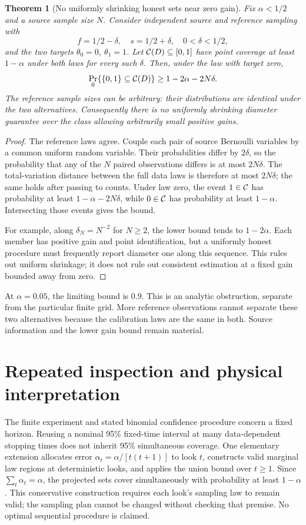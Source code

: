 \documentclass[11pt,a4paper]{article}
\newtheorem{theorem}{Theorem}\newtheorem{proposition}[theorem]{Proposition}\newtheorem{lemma}[theorem]{Lemma}
\theoremstyle{definition}\newtheorem{definition}[theorem]{Definition}
\begin{document}
\begin{theorem}[No uniformly shrinking honest sets near zero gain]\label{thm:weak}
Fix $\alpha<1/2$ and a source sample size $N$. Consider independent source and reference sampling with
\[
f=1/2-\delta,\quad s=1/2+\delta,\quad 0<\delta<1/2,
\]
and the two targets $\theta_0=0$, $\theta_1=1$. Let $\mathcal C(D)\subseteq[0,1]$ have point coverage at least $1-\alpha$ under both laws for every such $\delta$. Then, under the law with target zero,
\[
\Pr_0\{\{0,1\}\subseteq\mathcal C(D)\}\ge1-2\alpha-2N\delta.
\]
The reference sample sizes can be arbitrary: their distributions are identical under the two alternatives. Consequently there is no uniformly shrinking diameter guarantee over the class allowing arbitrarily small positive gains.
\end{theorem}
\begin{proof}
The reference laws agree. Couple each pair of source Bernoulli variables by a common uniform random variable. Their probabilities differ by $2\delta$, so the probability that any of the $N$ paired observations differs is at most $2N\delta$. The total-variation distance between the full data laws is therefore at most $2N\delta$; the same holds after passing to counts. Under law zero, the event $1\in\mathcal C$ has probability at least $1-\alpha-2N\delta$, while $0\in\mathcal C$ has probability at least $1-\alpha$. Intersecting those events gives the bound.

For example, along $\delta_N=N^{-2}$ for $N\ge2$, the lower bound tends to $1-2\alpha$. Each member has positive gain and point identification, but a uniformly honest procedure must frequently report diameter one along this sequence. This rules out uniform shrinkage; it does not rule out consistent estimation at a fixed gain bounded away from zero.
\end{proof}

At $\alpha=0.05$, the limiting bound is $0.9$. This is an analytic obstruction, separate from the particular finite grid. More reference observations cannot separate these two alternatives because the calibration laws are the same in both. Source information and the lower gain bound remain material.

\section{Repeated inspection and physical interpretation}

The finite experiment and stated binomial confidence procedure concern a fixed horizon. Reusing a nominal 95\% fixed-time interval at many data-dependent stopping times does not inherit 95\% simultaneous coverage. One elementary extension allocates error $\alpha_t=\alpha/[t(t+1)]$ to look $t$, constructs valid marginal law regions at deterministic looks, and applies the union bound over $t\ge1$. Since $\sum_t\alpha_t=\alpha$, the projected sets cover simultaneously with probability at least $1-\alpha$. This conservative construction requires each look's sampling law to remain valid; the sampling plan cannot be changed without checking that premise. No optimal sequential procedure is claimed.
\end{document}
